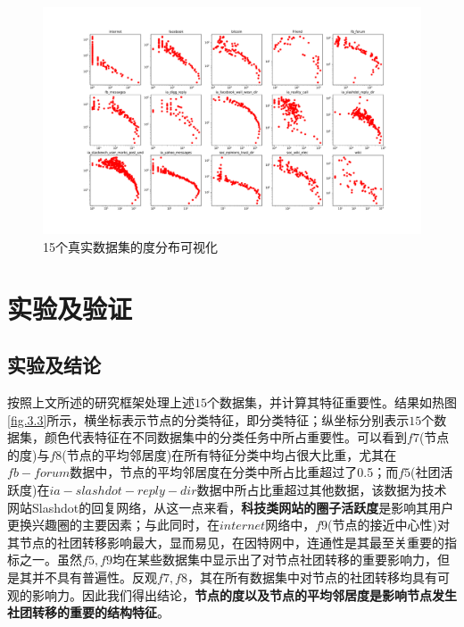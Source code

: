 \begin{figure}[!htbp]
	\setlength{\abovecaptionskip}{0pt} 
	\setlength{\belowcaptionskip}{10pt} 
	\includegraphics[width=.9\textwidth]{./figure/degrees.pdf}
	\caption{15个真实数据集的度分布可视化}
	\label{fig.3.2}
\end{figure}

\section{实验及验证}

\subsection{实验及结论}

按照上文所述的研究框架处理上述$15$个数据集，并计算其特征重要性。结果如热图\ref{fig.3.3}所示，横坐标表示节点的分类特征，即分类特征；纵坐标分别表示$15$个数据集，颜色代表特征在不同数据集中的分类任务中所占重要性。可以看到$f7$(节点的度)与$f8$(节点的平均邻居度)在所有特征分类中均占很大比重，尤其在$fb-forum$数据中，节点的平均邻居度在分类中所占比重超过了0.5；而$f5$(社团活跃度)在$ia-slashdot-reply-dir$数据中所占比重超过其他数据，该数据为技术网站Slashdot的回复网络，从这一点来看，\textbf{科技类网站的圈子活跃度}是影响其用户更换兴趣圈的主要因素；与此同时，在$internet$网络中，$f9$(节点的接近中心性)对其节点的社团转移影响最大，显而易见，在因特网中，连通性是其最至关重要的指标之一。虽然$f5,f9$均在某些数据集中显示出了对节点社团转移的重要影响力，但是其并不具有普遍性。反观$f7,f8$，其在所有数据集中对节点的社团转移均具有可观的影响力。因此我们得出结论，\textbf{节点的度以及节点的平均邻居度是影响节点发生社团转移的重要的结构特征}。


